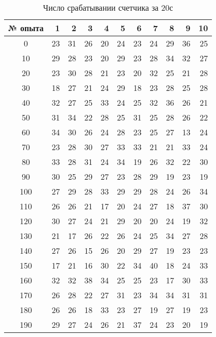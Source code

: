 \documentclass[a4paper, 12pt]{article}
\begin{document}
    \newpage
    \begin{table}[H]
    \begin{center}
    \begin{tabular}{|c|r|r|r|r|r|r|r|r|r|r|}
    \hline
    {№ опыта} &   1 &   2 &   3 &   4 &   5 &   6 &   7 &   8 &   9 &  10 \\
    \hline
    0	&  23 &	 31	&  26 &	 20	&  24 &	 23	&  24 &	 29	&  36 &  25	\\
    10	&  29 &	 28	&  23 &  20	&  29 &  23	&  28 &  34	&  32 &	 27	\\
    20	&  23 &	 30	&  28 &	 21	&  23 &	 20	&  32 &	 25	&  21 &	 28	\\
    30	&  18 &	 27	&  21 &	 24	&  29 &	 18	&  23 &	 28	&  25 &	 28	\\
    40	&  32 &	 27	&  25 &	 33	&  24 &	 25	&  32 &	 36	&  26 &	 21	\\
    50	&  31 &	 34	&  22 &	 28	&  25 &	 31	&  25 &	 28	&  26 &	 22	\\
    60	&  34 &	 30	&  26 &	 24	&  28 &	 23	&  25 &	 27	&  13 &	 24	\\
    70	&  23 &	 28	&  30 &	 27	&  33 &	 33	&  21 &	 21	&  33 &	 24	\\
    80	&  33 &	 28	&  31 &	 24	&  34 &	 19	&  26 &	 32	&  22 &	 30	\\
    90	&  30 &	 25	&  29 &	 27	&  23 &	 28	&  29 &	 19	&  23 &	 19	\\
    100	&  27 &	 29	&  28 &	 33	&  29 &	 29	&  28 &	 24	&  26 &	 34	\\
    110	&  26 &	 26	&  21 &	 17	&  20 &	 24	&  27 &	 18	&  37 &	 30	\\
    120	&  30 &	 27	&  24 &	 21	&  29 &	 20	&  20 &	 24	&  19 &	 32	\\
    130	&  21 &	 17	&  26 &	 22	&  26 &	 24	&  25 &	 34	&  27 &	 28	\\
    140	&  27 &	 26	&  15 &	 26	&  20 &	 29	&  27 &	 19	&  23 &	 23	\\
    150	&  17 &	 21	&  16 &	 30	&  22 &	 34	&  40 &	 18	&  24 &	 33	\\
    160	&  32 &	 32	&  38 &	 34	&  25 &	 25	&  23 &	 17	&  30 &	 33	\\
    170	&  26 &	 28	&  22 &	 27	&  31 &	 23	&  34 &	 34	&  31 &	 31	\\
    180	&  26 &	 26	&  18 &	 33	&  23 &	 27	&  19 &	 27	&  19 &	 23	\\
    190	&  29 &	 27	&  24 &	 26	&  21 &	 37	&  24 &	 23	&  20 &	 19	\\
    \hline
    \end{tabular}
    \caption{Число срабатывании счетчика за 20с}
    \end{center}
    \end{table}
\end{document}
